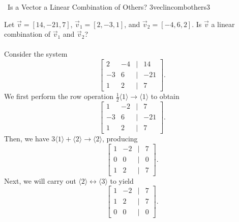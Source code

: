         \begin{example}{\Difficulty\,\Difficulty\,\,Is a Vector a Linear Combination of Others? 3}{veclincombothers3}
        
            Let \(\vec{v}=[14,-21,7]\), \(\vec{v}_1=[2,-3,1]\), and \(\vec{v}_2=[-4,6,2]\). Is \(\vec{v}\) a linear combination of \(\vec{v}_1\) and \(\vec{v}_2\)?
            \\
            \\
            Consider the system
            \begin{equation*}
                \begin{bmatrix}
                    2 & -4 & | & 14 \\
                    -3 & 6 & | & -21 \\
                    1 & 2 & | & 7
                \end{bmatrix}.
            \end{equation*}
            We first perform the row operation \(\frac{1}{2}\langle1\rangle\to\langle1\rangle\) to obtain
            \begin{equation*}
                \begin{bmatrix}
                    1 & -2 & | & 7 \\
                    -3 & 6 & | & -21 \\
                    1 & 2 & | & 7
                \end{bmatrix}.
            \end{equation*}
            Then, we have \(3\langle1\rangle+\langle2\rangle\to\langle2\rangle\), producing
            \begin{equation*}
                \begin{bmatrix}
                    1 & -2 & | & 7 \\
                    0 & 0 & | & 0 \\
                    1 & 2 & | & 7
                \end{bmatrix}.
            \end{equation*}
            Next, we will carry out \(\langle2\rangle\leftrightarrow\langle3\rangle\) to yield
            \begin{equation*}
                \begin{bmatrix}
                    1 & -2 & | & 7 \\
                    1 & 2 & | & 7 \\
                    0 & 0 & | & 0
                \end{bmatrix}.

\end{equation*}
\end{example}
